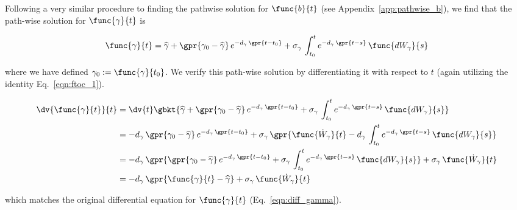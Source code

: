 Following a very similar procedure to finding the pathwise solution for $\func{b}{t}$ (see Appendix~\ref{app:pathwise_b}), we find that the path-wise solution for $\func{\gamma}{t}$ is

\begin{equation}
    \func{\gamma}{t} = \widehat{\gamma} + \gpr{\gamma_0 - \widehat{\gamma}}\,e^{-d_{\gamma}\,\gpr{t - t_0}} + \sigma_{\gamma}\,\int_{t_{0}}^{t} e^{-d_{\gamma}\,\gpr{t - s}}\,\func{d{W}_{\gamma}}{s}
    \label{eqn:pathwise_gamma}
\end{equation}

where we have defined $\gamma_{0} := \func{\gamma}{t_0}$. We verify this path-wise solution by differentiating it with respect to $t$ (again utilizing the identity Eq.~\ref{eqn:ftoc_1}).

\begin{align*}
    \dv{\func{\gamma}{t}}{t} &= \dv{t} \gbkt{\widehat{\gamma} + \gpr{\gamma_0 - \widehat{\gamma}}\,e^{-d_{\gamma}\,\gpr{t - t_0}} + \sigma_{\gamma}\,\int_{t_{0}}^{t} e^{-d_{\gamma}\,\gpr{t - s}}\,\func{d{W}_{\gamma}}{s}} \\
    	&= -d_{\gamma}\,\gpr{\gamma_0 - \widehat{\gamma}}\,e^{-d_{\gamma}\,\gpr{t - t_0}} + \sigma_{\gamma}\,\gpr{\func{\dot{W}_{\gamma}}{t} - d_{\gamma}\,\int_{t_{0}}^{t} e^{-d_{\gamma}\,\gpr{t - s}}\,\func{d{W}_{\gamma}}{s}} \\
    	&= -d_{\gamma}\,\gpr{\gpr{\gamma_0 - \widehat{\gamma}}\,e^{-d_{\gamma}\,\gpr{t - t_0}} + \sigma_{\gamma}\,\int_{t_{0}}^{t} e^{-d_{\gamma}\,\gpr{t - s}}\,\func{d{W}_{\gamma}}{s}} + \sigma_{\gamma}\,\func{\dot{W}_{\gamma}}{t} \\
    	&= -d_{\gamma}\,\gpr{\func{\gamma}{t} - \widehat{\gamma}} + \sigma_{\gamma}\,\func{\dot{W}_{\gamma}}{t}
\end{align*}

which matches the original differential equation for $\func{\gamma}{t}$ (Eq.~\ref{eqn:diff_gamma}).